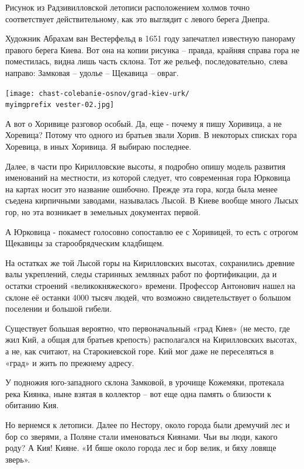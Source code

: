 Рисунок из Радзивилловской летописи расположением холмов точно соответствует действительному, как это выглядит с левого берега Днепра.

Художник Абрахам ван Вестерфельд в 1651 году запечатлел известную панораму правого берега Киева. Вот она на копии рисунка – правда, крайняя справа гора не поместилась, видна лишь часть склона. Тот же рельеф, последовательно, слева направо: Замковая – удолье – Щекавица – овраг.
 
\begin{center}
\texttt{[image: chast-colebanie-osnov/grad-kiev-urk/\\myimgprefix vester-02.jpg]}
\end{center} 

А вот о Хоривице разговор особый. Да, еще - почему я пишу Хоривица, а не Хоревица? Потому что одного из братьев звали Хорив. В некоторых списках гора Хоревица, в иных Хоривица. Я выбираю последнее.

Далее, в части про Кирилловские высоты, я подробно опишу модель развития именований на местности, из которой следует, что современная гора Юрковица на картах носит это название ошибочно. Прежде эта гора, когда была менее съедена кирпичными заводами, называлась Лысой. В Киеве вообще много Лысых гор, но эта возникает в земельных документах первой.

А Юрковица - покамест голосовно сопоставлю ее с Хоривицей, то есть с отрогом Щекавицы за старообрядческим кладбищем. 

На остатках же той Лысой горы на Кирилловских высотах, сохранились древние валы укреплений, следы старинных земляных работ по фортификации, да и остатки строений «великокняжеского» времени. Профессор Антонович нашел на склоне её останки 4000 тысяч людей, что возможно свидетельствует о большом поселении и большой гибели.

Существует большая вероятно, что первоначальный «град Киев» (не место, где жил Кий, а общая для братьев крепость) располагался на Кирилловских высотах, а не, как считают, на Старокиевской горе. Кий мог даже не переселяться в «град» и жить по прежнему адресу.

У подножия юго-западного склона Замковой, в урочище Кожемяки, протекала река Киянка, ныне взятая в коллектор – вот еще одна память о близости к обитанию Кия.

Но вернемся к летописи. Далее по Нестору, около города были дремучий лес и бор со зверями, а Поляне стали именоваться Киянами. Чьи вы люди, какого роду? А Кия! Кияне. «И бяше около города лес и бор велик, и бяху ловяще зверь».

